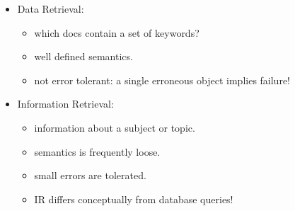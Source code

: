 \begin{breakbox}
\begin{itemize}
	\item Data Retrieval:
		\begin{itemize}
			\item which docs contain a set of keywords?
			\item well defined semantics.
			\item not error tolerant: a single erroneous object implies failure!
		\end{itemize}
	\item Information Retrieval:
		\begin{itemize}
			\item information about a subject or topic.
			\item semantics is frequently loose.
			\item small errors are tolerated.
			\item IR differs conceptually from database queries!
		\end{itemize}
\end{itemize}
\end{breakbox}

